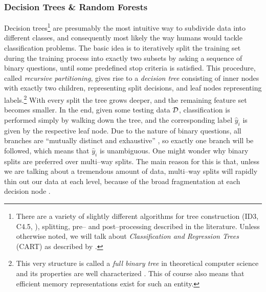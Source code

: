 
\subsubsection{Decision Trees \& Random Forests}

Decision trees\footnote{There are a variety of slightly different algorithms for tree construction (ID3, C4.5, \etc), splitting, pre-- and post--processing described in the literature. Unless otherwise noted, we will talk about \emph{Classification and Regression Trees} (CART) as described by \citet{breiman1984}.} \citep{breiman1984} are presumably the most intuitive way to subdivide data into different classes, and consequently most likely the way humans would tackle classification problems. The basic idea is to iteratively split the training set during the training process into exactly two subsets by asking a sequence of binary questions, until some predefined stop criteria is satisfied. This procedure, called \emph{recursive partitioning}, gives rise to a \emph{decision tree} consisting of inner nodes with exactly two children, representing split decisions, and leaf nodes representing labels.\footnote{This very structure is called a \emph{full binary tree} in  theoretical computer science and its properties are well characterized \citep{knuth1981}. This of course also means that efficient memory representations exist for such an entity.} With every split the tree grows deeper, and the remaining feature set becomes smaller. In the end, given some testing data $\mathcal{D}$, classification is performed simply by walking down the tree, and the corresponding label $\hat y_i$ is given by the respective leaf node. Due to the nature of binary questions, all branches are ``mutually distinct and exhaustive'' \citep{duda2001}, so exactly one branch will be followed, which means that $\hat y_i$ is unambiguous. One might wonder why binary splits are preferred over multi--way splits. The main reason for this is that, unless we are talking about a tremendous amount of data, multi--way splits will rapidly thin out our data at each level, because of the broad fragmentation at each decision node \citep{hastie2001}. %
\\



